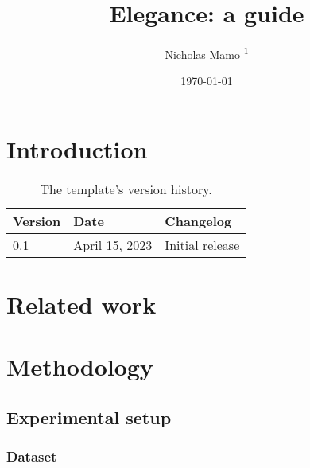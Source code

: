 \documentclass{adonis}
\title{Elegance: a guide}
\author{Nicholas Mamo \textsuperscript{1}}
\affiliation{\textsuperscript{1} Independent}
\date{\today}
\begin{document}
	\maketitle
	
	\section{Introduction}
	
		\lipsum[1-3]
		
		\begin{table*}[t!]
			\begin{tabularx}{\linewidth}{ l l X }
				\textbf{Version} & \textbf{Date} & \textbf{Changelog} \\ \hline
				0.1 & April 15, 2023 & Initial release \\
			\end{tabularx}
			\caption{The template's version history.}
			\label{table: version history}
		\end{table*}
	
	\section{Related work}
	
		\lipsum[4-8]
		
	\section{Methodology}
	
		\lipsum[9]
		
		\subsection{Experimental setup}
		
			\lipsum[10]
			
			\subsubsection{Dataset}
			
				\lipsum[11]
\end{document}
